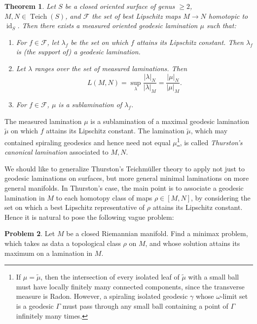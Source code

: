 \documentclass[reqno,11pt]{amsart}
\DeclareMathOperator{\id}{id}
\DeclareMathOperator{\Teich}{Teich}
\newcommand{\dfn}[1]{\emph{#1}\index{#1}}
\newtheorem{theorem}{Theorem}[section]
\theoremstyle{definition}
\newtheorem{problem}[theorem]{Problem}
\numberwithin{equation}{section}
\begin{document}
\begin{theorem}\label{existence of Thurston lamination}
Let $S$ be a closed oriented surface of genus $\geq 2$, $M, N \in \Teich(S)$, and $\mathcal F$ the set of best Lipschitz maps $M \to N$ homotopic to $\id_S$.
Then there exists a measured oriented geodesic lamination $\mu$ such that:
\begin{enumerate}
\item For $f \in \mathcal F$, let $\lambda_f$ be the set on which $f$ attains its Lipschitz constant. Then $\lambda_f$ is (the support of) a geodesic lamination.
\item Let $\lambda$ ranges over the set of measured laminations. Then
\begin{equation}\label{L is K}
L(M, N) = \sup_\lambda \frac{|\lambda|_N}{|\lambda|_M} = \frac{|\mu|_N}{|\mu|_M}.
\end{equation}
\item For $f \in \mathcal F$, $\mu$ is a sublamination of $\lambda_f$.
\end{enumerate}
\end{theorem}

The measured lamination $\mu$ is a sublamination of a maximal geodesic lamination $\tilde \mu$ on which $f$ attains its Lipschitz constant.
The lamination $\tilde \mu$, which may contained spiraling geodesics and hence need not equal $\mu$\footnote{If $\mu = \tilde \mu$, then the intersection of every isolated leaf of $\tilde \mu$ with a small ball must have locally finitely many connected components, since the transverse measure is Radon. However, a spiraling isolated geodesic $\gamma$ whose $\omega$-limit set is a geodesic $\Gamma$ must pass through any small ball containing a point of $\Gamma$ infinitely many times.}, is called \dfn{Thurston's canonical lamination} associated to $M, N$.

We should like to generalize Thurston's Teichm\"uller theory to apply not just to geodesic laminations on surfaces, but more general minimal laminations on more general manifolds.
In Thurston's case, the main point is to associate a geodesic lamination in $M$ to each homotopy class of maps $\rho \in [M, N]$, by considering the set on which a best Lipschitz representative of $\rho$ attains its Lipschitz constant.
Hence it is natural to pose the following vague problem:

\begin{problem}
	Let $M$ be a closed Riemannian manifold.
	Find a minimax problem, which takes as data a topological class $\rho$ on $M$, and whose solution attains its maximum on a lamination in $M$.
\end{problem}
\end{document}
